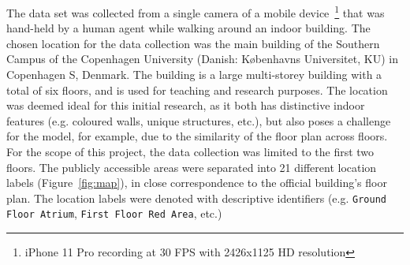\documentclass[a4paper]{article}
\begin{document}
  The data set was collected from a single camera of a mobile
  device~\footnote{iPhone 11 Pro recording at 30 FPS with 2426x1125 HD
  resolution} that was hand-held by a human agent while walking around an indoor
  building. The chosen location for the data collection was the main building of
  the Southern Campus of the Copenhagen University (Danish: K\o{}benhavns
  Universitet, KU) in Copenhagen S, Denmark. The building is a large
  multi-storey building with a total of six floors, and is used for teaching and
  research purposes. The location was deemed ideal for this initial research, as
  it both has distinctive indoor features (e.g. coloured walls, unique
  structures, etc.), but also poses a challenge for the model, for example, due
  to the similarity of the floor plan across floors.
  For the scope of this project, the data collection was limited to the first
  two floors. The publicly accessible areas were separated into 21 different
  location labels (Figure~\ref{fig:map}), in close correspondence to the
  official building's floor plan. The location labels were denoted with
  descriptive identifiers (e.g. \texttt{Ground Floor Atrium},
  \texttt{First Floor Red Area}, etc.)
\end{document}
